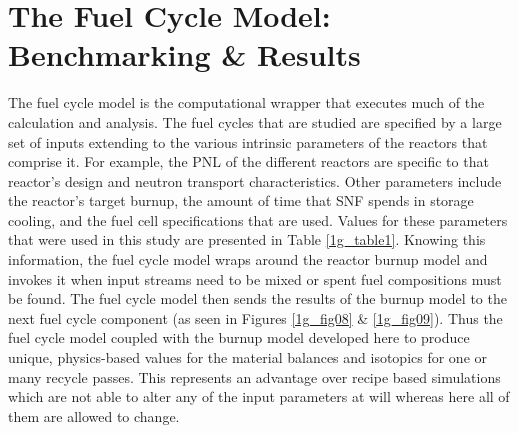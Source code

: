 \section{The Fuel Cycle Model: Benchmarking \& Results}
\label{1g_sec:fcmodel_benchmark}
The fuel cycle model is the computational wrapper that executes much of the calculation and analysis.  The fuel 
cycles that are studied are specified by a large set of inputs extending to the various intrinsic parameters of 
the reactors that comprise it.  For example, the PNL of the different reactors are specific to that reactor's 
design and neutron transport characteristics.  Other parameters include the reactor's target burnup, the 
amount of time that SNF spends in storage cooling, and the fuel cell specifications that are used.  Values 
for these parameters that were used in this study are presented in Table \ref{1g_table1}.  Knowing this information, the 
fuel cycle model wraps around the reactor burnup model and invokes it when input streams need to be mixed 
or spent fuel compositions must be found.  The fuel cycle model then sends the results of the burnup model 
to the next fuel cycle component (as seen in Figures \ref{1g_fig08} \& \ref{1g_fig09}).  Thus the fuel cycle 
model coupled with the burnup model developed here to produce unique, physics-based values for the material 
balances and isotopics for one or many recycle passes.  This represents an advantage over recipe based 
simulations which are not able to alter any of the input parameters at will whereas here all of them are 
allowed to change. 

